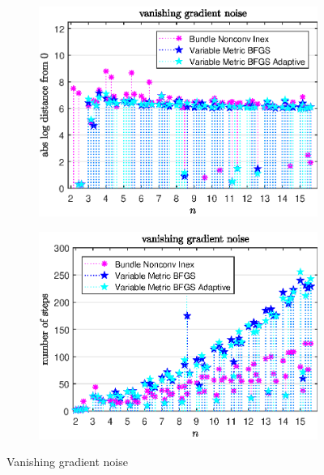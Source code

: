 \begin{figure}[H]
	\begin{subfigure}{0.49\textwidth}
		\includegraphics[width=\textwidth]{Pictures/Plots/vanishing_gradient_noise.eps}%
	\end{subfigure}
	\begin{subfigure}{0.49\textwidth}
		\includegraphics[width=\textwidth]{Pictures/Plots/steps_vanishing_gradient_noise.eps}%
	\end{subfigure}
	\caption{Vanishing gradient noise}%
	\label{fig_van_grad_noise}%
\end{figure}

